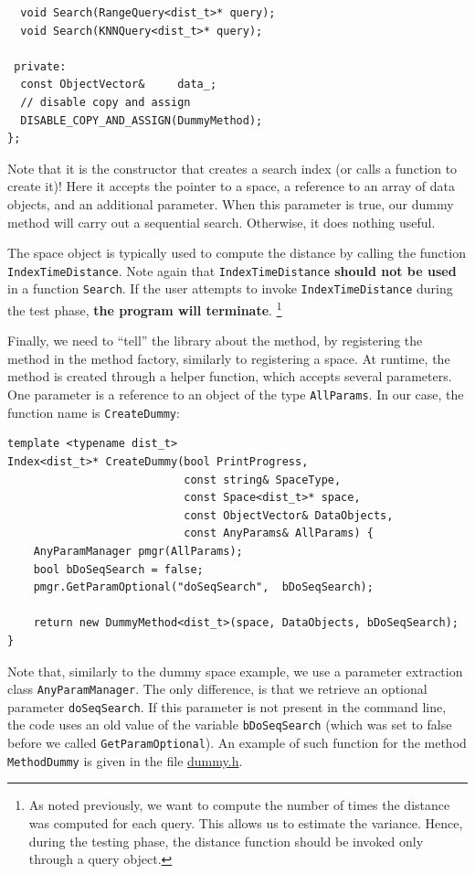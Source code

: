 \documentclass[runningheads,a4paper]{llncs}
\newcommand{\ttt}[1]{\texttt{#1}}
\begin{document}
{\begin{verbatim}
  void Search(RangeQuery<dist_t>* query);
  void Search(KNNQuery<dist_t>* query);

 private:
  const ObjectVector&     data_;
  // disable copy and assign
  DISABLE_COPY_AND_ASSIGN(DummyMethod);
};
\end{verbatim}

Note that it is the constructor that creates a search index (or calls a function to create it)!
Here it accepts the pointer to a space,
a reference to an array of data objects, 
and an additional parameter.
When this parameter is true, our dummy method will carry out a sequential search.
Otherwise, it does nothing useful.

The space object is typically used to compute the distance by calling
the function \ttt{IndexTimeDistance}.
Note again that \ttt{IndexTimeDistance} \textbf{should not be used} in a function
\ttt{Search}. 
If the user attempts to invoke \ttt{IndexTimeDistance} during the test phase,
\textbf{the program will terminate}.
\footnote{As noted previously, we want to compute the number of times
the distance was computed for each query. This allows us to estimate the variance.
Hence, during the testing phase, the distance function should be invoked only through
a query object.}


Finally, we need to ``tell'' the library about the method,
by registering the method in the method factory,
similarly to registering a space.
At runtime, the method is created through a helper function,
which accepts several parameters.
One parameter is a reference to an object of the type \ttt{AllParams}.
In our case, the function name is \ttt{CreateDummy}:

\begin{verbatim}
template <typename dist_t>
Index<dist_t>* CreateDummy(bool PrintProgress,
                           const string& SpaceType,
                           const Space<dist_t>* space,
                           const ObjectVector& DataObjects,
                           const AnyParams& AllParams) {
    AnyParamManager pmgr(AllParams);
    bool bDoSeqSearch = false;
    pmgr.GetParamOptional("doSeqSearch",  bDoSeqSearch);

    return new DummyMethod<dist_t>(space, DataObjects, bDoSeqSearch);
}
\end{verbatim}
Note that, similarly to the dummy space example,
we use a parameter extraction class \ttt{AnyParamManager}.
The only difference, is that we retrieve an optional parameter \ttt{doSeqSearch}.
If this parameter is not present in the command line,
the code uses an old value of the variable \ttt{bDoSeqSearch}
(which was set to false before we called \ttt{GetParamOptional}). 
An example of such function for the method \ttt{MethodDummy}
is given in the file \href{https://github.com/searchivarius/NonMetricSpaceLib/blob/master/similarity_search/include/factory/method/dummy.h}{dummy.h}.

}
\end{document}
